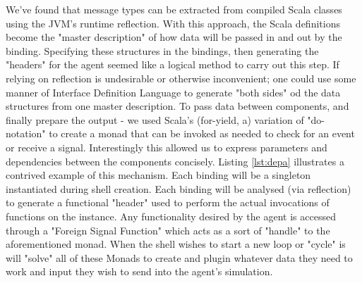 We've found that message types can be extracted from compiled Scala classes using the JVM's runtime reflection.
    With this approach, the Scala definitions become the "master description" of how data will be passed in and out by the binding.
        Specifying these structures in the bindings, then generating the "headers" for the agent seemed like a logical method to carry out this step.
        If relying on reflection is undesirable or otherwise inconvenient; one could use some manner of Interface Definition Language to generate "both sides" od the data structures from one master description.
To pass data between components, and finally prepare the output - we used Scala's (for-yield, a) variation of "do-notation" to create a monad that can be invoked as needed to check for an event or receive a signal.
    Interestingly this allowed us to express parameters and dependencies between the components concisely.
    Listing \ref{lst:depa} illustrates a contrived example of this mechanism.
Each binding will be a singleton instantiated during shell creation.
    Each binding will be analysed (via reflection) to generate a functional "header" used to perform the actual invocations of functions on the instance.
    Any functionality desired by the agent is accessed through a "Foreign Signal Function" which acts as a sort of "handle" to the aforementioned monad.
    When the shell wishes to start a new loop or "cycle" is will "solve" all of these Monads to create and plugin whatever data they need to work and input they wish to send into the agent's simulation.

